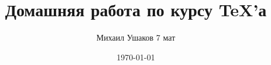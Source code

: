 \documentclass{article}
\title{\bfseries Домашняя работа \textnumero 7 по курсу \TeX'а}
\author{Михаил Ушаков 7 мат}
\date{\today}
\begin{document}

\pagebreak




\end{document}
